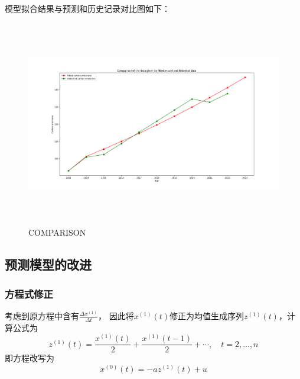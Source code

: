 \documentclass[a4paper, 12pt]{article}
\numberwithin{equation}{section}
\begin{document}
                    模型拟合结果与预测和历史记录对比图如下：
                    \begin{figure}[h]
                        \centering
                        \includegraphics[height=9cm,width=15cm]{fit_and_his_q4.png}
                        \caption{COMPARISON}
                    \end{figure}

    {}


    {}


    {}
        \subsection{预测模型的改进}
            \subsubsection{方程式修正}
                考虑到原方程中含有$ \frac{\Delta x^{ (1)}}{\Delta t} $，
                因此将$ x^{ (1)} (t) $修正为均值生成序列$ z^{ (1)} (t) $，计算公式为
                \[ z^{ (1)} (t) = \frac{x^{ (1)} (t)}{2} + \frac{x^{ (1)} (t - 1)}{2} + \cdots, \quad t = 2, \ldots, n \]
                即方程改写为
                \[ x^{ (0)} (t) = -az^{ (1)} (t) + u \]
\end{document}

